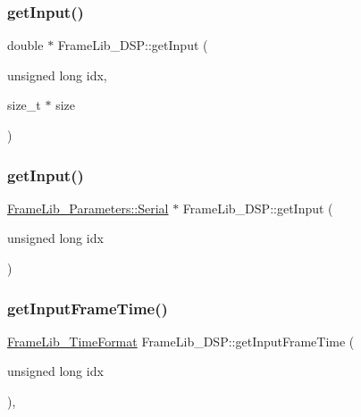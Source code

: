\mbox{\label{class_frame_lib___d_s_p_a1d139d046d9269f9f6ac34c8ee8ab516}} 
\subsubsection{\texorpdfstring{get\+Input()}{getInput()}\hspace{0.1cm}{\footnotesize\ttfamily [1/2]}}
{\footnotesize\ttfamily double $\ast$ Frame\+Lib\+\_\+\+D\+S\+P\+::get\+Input (\begin{DoxyParamCaption}\item[{unsigned long}]{idx,  }\item[{size\+\_\+t $\ast$}]{size }\end{DoxyParamCaption})\hspace{0.3cm}{\ttfamily [protected]}}

\mbox{\label{class_frame_lib___d_s_p_a6212469bed2fe6d4a994062bc85db98f}} 
\subsubsection{\texorpdfstring{get\+Input()}{getInput()}\hspace{0.1cm}{\footnotesize\ttfamily [2/2]}}
{\footnotesize\ttfamily \hyperlink{class_frame_lib___parameters_1_1_serial}{Frame\+Lib\+\_\+\+Parameters\+::\+Serial} $\ast$ Frame\+Lib\+\_\+\+D\+S\+P\+::get\+Input (\begin{DoxyParamCaption}\item[{unsigned long}]{idx }\end{DoxyParamCaption})\hspace{0.3cm}{\ttfamily [protected]}}

\mbox{\label{class_frame_lib___d_s_p_ab50bdad21f69e0ed9d33ef25ee830b0c}} 
\subsubsection{\texorpdfstring{get\+Input\+Frame\+Time()}{getInputFrameTime()}}
{\footnotesize\ttfamily \hyperlink{_frame_lib___types_8h_a699a4071a9eaaa283906a5ebd0a79ac0}{Frame\+Lib\+\_\+\+Time\+Format} Frame\+Lib\+\_\+\+D\+S\+P\+::get\+Input\+Frame\+Time (\begin{DoxyParamCaption}\item[{unsigned long}]{idx }\end{DoxyParamCaption})\hspace{0.3cm}{\ttfamily [inline]}, {\ttfamily [protected]}}


